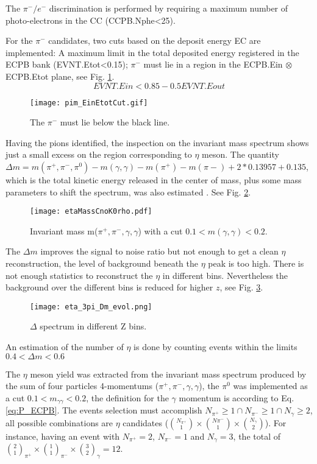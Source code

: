 The $\pi^-/e^-$ discrimination is performed by requiring a maximum number of photo-electrons in the CC (CCPB.Nphe<25). 

For the $\pi^-$ candidates, two cuts based on the deposit energy EC are implemented: A maximum limit in the total deposited energy registered in the ECPB bank (EVNT.Etot<0.15); $\pi^-$ must  lie in a region in the ECPB.Ein $\otimes$ ECPB.Etot plane, see Fig. \ref{fig:pim_ECPB}.
\begin{equation}
EVNT.Ein < 0.85 - 0.5EVNT.Eout
\label{eq:pim_ECPBCut}
\end{equation}
%
\begin{figure}[!ht]
\centering
\texttt{[image: pim\_EinEtotCut.gif]}
\caption{The $\pi^-$ must lie below the black line.}
\label{fig:pim_ECPB}
\end{figure}

Having the pions identified, the inspection on the invariant mass spectrum shows just a small excess on the region corresponding to $\eta$ meson. The quantity $\Delta m = m(\pi^+,\pi^-,\pi^0) - m(\gamma,\gamma) - m(\pi^+) - m(\pi-) + 2*0.13957 + 0.135$, which is the total kinetic energy released in the center of mass, plus some mass parameters to shift the spectrum, was also estimated \cite{D_meson}.  See Fig. \ref{fig:m_pippimpi0}.
\begin{figure}[!ht]
\centering
\texttt{[image: etaMassCnoK0rho.pdf]}
\caption{Invariant mass  m($\pi^+,\pi^-,\gamma,\gamma$) with a cut $0.1<m(\gamma,\gamma)<0.2$.}
\label{fig:m_pippimpi0}
\end{figure}

The $\Delta m$ improves the signal to noise ratio but not enough to get a clean $\eta$ reconstruction, the level of background beneath the $\eta$ peak is too high.
There is not enough statistics to reconstruct the $\eta$ in different bins. Nevertheless the background over the different bins is reduced for higher $z$, see Fig. \ref{fig:Dm_evol}.

\begin{figure}[!ht]
\centering
\texttt{[image: eta\_3pi\_Dm\_evol.png]}
\caption{$\Delta$ spectrum in different Z bins.}
\label{fig:Dm_evol}
\end{figure}

An estimation of the number of $\eta$ is done by counting events within the limits $0.4<\Delta m<0.6$
\clearpage

The $\eta$ meson yield was extracted from the invariant mass spectrum produced by the sum of four particles 4-momentums ($\pi^+,\pi^-,\gamma,\gamma$), the $\pi^0$ was implemented as a cut $0.1<m_{\gamma\gamma}<0.2$, the definition for the $\gamma$ momentum is according to Eq. \eqref{eq:P_ECPB}. The events selection must accomplish $N_{\pi^+}\geqslant 1 \cap N_{\pi^-}\geqslant 1 \cap N_{\gamma}\geqslant 2$, all possible combinations are $\eta$ candidates ($\binom{N_{\pi^+}}{1}\times\binom{N{\pi^-}}{1}\times\binom{N_{\gamma}}{2}$). For instance, having an event with $N_{\pi^+}=2$, $N_{\pi^-}=1$ and $N_{\gamma}=3$, the total of $\binom{2}{1}_{\pi^+}\times\binom{1}{1}_{\pi^-}\times\binom{3}{2}_{\gamma}=12$.

